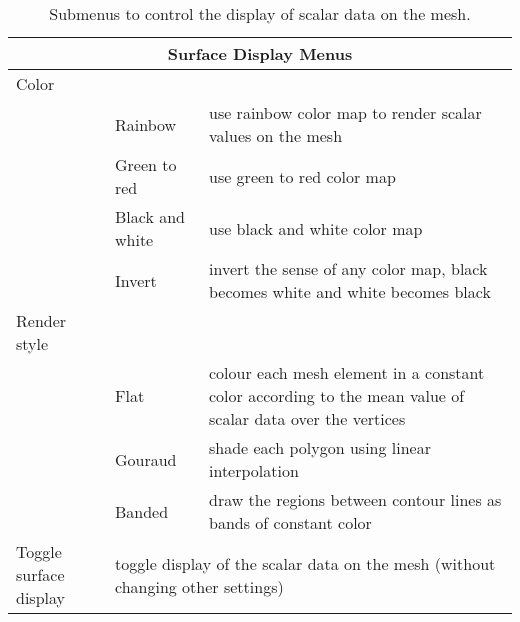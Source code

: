 \begin{table}[ht]
  \begin{center}
    \begin{tabular}{|l|l|p{2.5 in}|} \hline
      \multicolumn{3}{|c|}{Surface Display Menus} \\ \hline \hline
    Color & & \\
    &  Rainbow  & use rainbow color map to render scalar values on the mesh\\
    &  Green to red & use green to red color map\\
    &  Black and white & use black and white color map\\ 
    &  Invert & invert the sense of any color map, \eg{} black becomes
        white and white becomes black \\ \hline
    Render style & & \\
    &  Flat & colour each mesh element in a constant
       color according to the mean value of scalar data over the vertices\\
    &  Gouraud & shade each polygon using linear interpolation \\
    &  Banded & draw the regions between contour lines as bands of constant
       color\\  \hline
    Toggle surface display
    & \multicolumn{2}{|l|}{toggle display of the scalar data on the mesh
    (without changing other settings)}\\ \hline
    \end{tabular}
  \end{center}
\caption{Submenus to control the display of scalar data on the mesh.}
\end{table}

